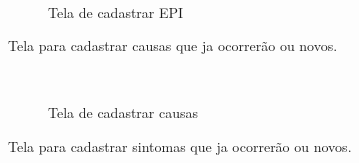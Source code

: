 \begin{figure}[H]
		\caption{\label{Cadastro_Epi_Sistema} Tela de cadastrar EPI}
	\centering
	\mbox{%
		\qquad
	}
	
\end{figure}
\newpage

Tela para cadastrar causas que ja ocorrerão ou novos.

\begin{figure}[H]
		\caption{\label{Cadastro_Causa_Defeito} Tela de cadastrar causas}
	\centering
	\mbox{%
		\qquad
	}
	
\end{figure}
\newpage

Tela para cadastrar sintomas que ja ocorrerão ou novos.

